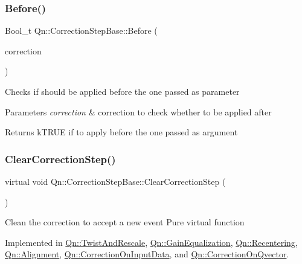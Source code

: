 \subsubsection{\texorpdfstring{Before()}{Before()}}
{\footnotesize\ttfamily Bool\+\_\+t Qn\+::\+Correction\+Step\+Base\+::\+Before (\begin{DoxyParamCaption}\item[{const \mbox{\hyperlink{classQn_1_1CorrectionStepBase}{Correction\+Step\+Base}} $\ast$}]{correction }\end{DoxyParamCaption})}

Checks if should be applied before the one passed as parameter 
\begin{DoxyParams}{Parameters}
{\em correction} & correction to check whether to be applied after \\
\hline
\end{DoxyParams}
\begin{DoxyReturn}{Returns}
k\+T\+R\+UE if to apply before the one passed as argument 
\end{DoxyReturn}
\mbox{\label{classQn_1_1CorrectionStepBase_a879c47010a868c19bd08042445662e2e}} 
\subsubsection{\texorpdfstring{Clear\+Correction\+Step()}{ClearCorrectionStep()}}
{\footnotesize\ttfamily virtual void Qn\+::\+Correction\+Step\+Base\+::\+Clear\+Correction\+Step (\begin{DoxyParamCaption}{ }\end{DoxyParamCaption})\hspace{0.3cm}{\ttfamily [pure virtual]}}

Clean the correction to accept a new event Pure virtual function 

Implemented in \mbox{\hyperlink{classQn_1_1TwistAndRescale_a07d06e5a437221d08bdba6078af1c596}{Qn\+::\+Twist\+And\+Rescale}}, \mbox{\hyperlink{classQn_1_1GainEqualization_a8ee1f2ecf6929de35d455515a067ac9c}{Qn\+::\+Gain\+Equalization}}, \mbox{\hyperlink{classQn_1_1Recentering_a692ae2cc6740be54d0b1591a3db62d39}{Qn\+::\+Recentering}}, \mbox{\hyperlink{classQn_1_1Alignment_aba2ba181fbf1572b646ed0d225cb773b}{Qn\+::\+Alignment}}, \mbox{\hyperlink{classQn_1_1CorrectionOnInputData_a8da92a3389c8654961199f123d5e6a6d}{Qn\+::\+Correction\+On\+Input\+Data}}, and \mbox{\hyperlink{classQn_1_1CorrectionOnQvector_aeba6db851f1a9ac5c6fd7adbd81de140}{Qn\+::\+Correction\+On\+Qvector}}.

